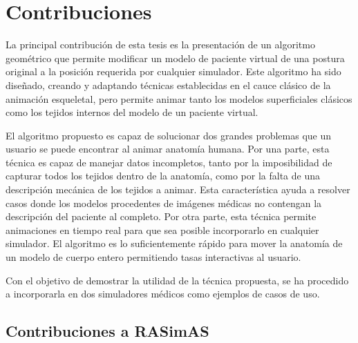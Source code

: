 \section{Contribuciones}
\label{intro:contribuciones}

La principal contribución de esta tesis es la presentación de un algoritmo geométrico que permite modificar un modelo de paciente virtual de una postura original a la posición requerida por cualquier simulador. Este algoritmo ha sido diseñado, creando y adaptando técnicas establecidas en el cauce clásico de la animación esqueletal, pero permite animar tanto los modelos superficiales clásicos como los tejidos internos del modelo de un paciente virtual.

El algoritmo propuesto es capaz de solucionar dos grandes problemas que un usuario se puede encontrar al animar anatomía humana. Por una parte, esta técnica es capaz de manejar datos incompletos, tanto por la imposibilidad de capturar todos los tejidos dentro de la anatomía, %
como por la falta de una descripción mecánica de los tejidos a animar. Esta característica ayuda a resolver casos donde los modelos procedentes de imágenes médicas %
no contengan la descripción del paciente al completo. Por otra parte, esta técnica permite animaciones en tiempo real para que sea posible incorporarlo en cualquier simulador. El algoritmo es lo suficientemente rápido para mover la anatomía de un modelo de cuerpo entero permitiendo tasas interactivas al usuario.

Con el objetivo de demostrar la utilidad de la técnica propuesta, se ha procedido a incorporarla en dos simuladores médicos como ejemplos de casos de uso. 

\subsection{Contribuciones a RASimAS}



